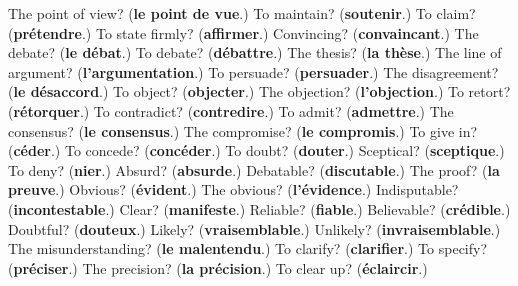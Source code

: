 \begin{tcolorbox}[breakable,colback=teal!4,colframe=teal!35!black,title={Before you move on}]
The point of view? (\textbf{le point de vue}.) To maintain? (\textbf{soutenir}.) To claim? (\textbf{prétendre}.) To state firmly? (\textbf{affirmer}.) Convincing? (\textbf{convaincant}.) The debate? (\textbf{le débat}.) To debate? (\textbf{débattre}.) The thesis? (\textbf{la thèse}.) The line of argument? (\textbf{l'argumentation}.) To persuade? (\textbf{persuader}.) The disagreement? (\textbf{le désaccord}.) To object? (\textbf{objecter}.) The objection? (\textbf{l'objection}.) To retort? (\textbf{rétorquer}.) To contradict? (\textbf{contredire}.) To admit? (\textbf{admettre}.) The consensus? (\textbf{le consensus}.) The compromise? (\textbf{le compromis}.) To give in? (\textbf{céder}.) To concede? (\textbf{concéder}.) To doubt? (\textbf{douter}.) Sceptical? (\textbf{sceptique}.) To deny? (\textbf{nier}.) Absurd? (\textbf{absurde}.) Debatable? (\textbf{discutable}.) The proof? (\textbf{la preuve}.) Obvious? (\textbf{évident}.) The obvious? (\textbf{l'évidence}.) Indisputable? (\textbf{incontestable}.) Clear? (\textbf{manifeste}.) Reliable? (\textbf{fiable}.) Believable? (\textbf{crédible}.) Doubtful? (\textbf{douteux}.) Likely? (\textbf{vraisemblable}.) Unlikely? (\textbf{invraisemblable}.) The misunderstanding? (\textbf{le malentendu}.) To clarify? (\textbf{clarifier}.) To specify? (\textbf{préciser}.) The precision? (\textbf{la précision}.) To clear up? (\textbf{éclaircir}.)
\end{tcolorbox}
